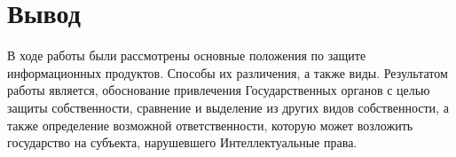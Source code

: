 \section{Вывод}
В ходе работы были рассмотрены основные положения по защите информационных продуктов.
Способы их различения, а также виды.
Результатом работы является,
	обоснование привлечения Государственных органов с целью защиты собственности,
	сравнение и выделение из других видов собственности,
	а также определение возможной ответственности,
		которую может возложить государство на субъекта,
			нарушевшего Интеллектуальные права.
